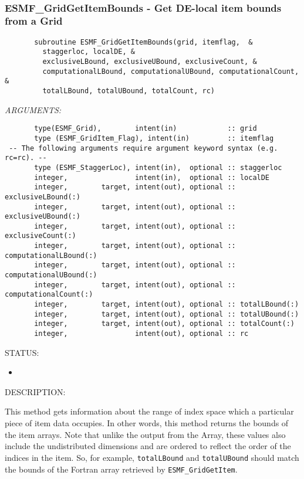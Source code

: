  
\mbox{}\hrulefill\ 
 
\subsubsection [ESMF\_GridGetItemBounds] {ESMF\_GridGetItemBounds - Get DE-local item bounds from a Grid}


 
\begin{verbatim}       subroutine ESMF_GridGetItemBounds(grid, itemflag,  &
         staggerloc, localDE, &
         exclusiveLBound, exclusiveUBound, exclusiveCount, &
         computationalLBound, computationalUBound, computationalCount,  &
         totalLBound, totalUBound, totalCount, rc)
 \end{verbatim}{\em ARGUMENTS:}
\begin{verbatim}       type(ESMF_Grid),        intent(in)            :: grid
       type (ESMF_GridItem_Flag), intent(in)         :: itemflag
 -- The following arguments require argument keyword syntax (e.g. rc=rc). --
       type (ESMF_StaggerLoc), intent(in),  optional :: staggerloc
       integer,                intent(in),  optional :: localDE
       integer,        target, intent(out), optional :: exclusiveLBound(:)
       integer,        target, intent(out), optional :: exclusiveUBound(:)
       integer,        target, intent(out), optional :: exclusiveCount(:)
       integer,        target, intent(out), optional :: computationalLBound(:)
       integer,        target, intent(out), optional :: computationalUBound(:)
       integer,        target, intent(out), optional :: computationalCount(:)
       integer,        target, intent(out), optional :: totalLBound(:)
       integer,        target, intent(out), optional :: totalUBound(:)
       integer,        target, intent(out), optional :: totalCount(:)
       integer,                intent(out), optional :: rc\end{verbatim}
{\sf STATUS:}
   \begin{itemize}
   \item{}
   \end{itemize}
  
{\sf DESCRIPTION:\\ }


    This method gets information about the range of index space which a particular
    piece of item data occupies.  In other words, this method returns the
    bounds of the item arrays.  Note that unlike the output from the
    Array, these values also include the undistributed dimensions and are
    ordered to reflect the order of the indices in the item. So, for example,
    {\tt totalLBound} and {\tt totalUBound} should match the bounds of the Fortran array
    retrieved by {\tt ESMF\_GridGetItem}.
  

